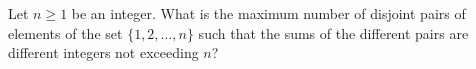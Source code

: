 Let $n \geq 1$ be an integer. What is the maximum number of disjoint pairs of elements of the set $\{1, 2, \ldots, n\}$ such that the sums of the different pairs are different integers not exceeding $n$?
